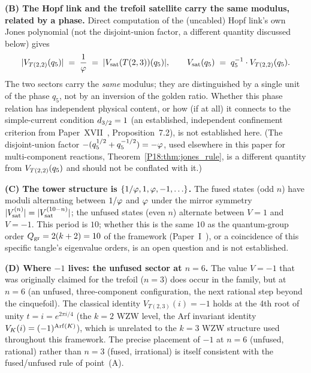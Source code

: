 \begin{remark}[The confinement criterion: fusion, not sector, and a phase relation between $\QH=2$ and $\QH=3$]
\textbf{(B) The Hopf link and the trefoil satellite carry the same
modulus, related by a phase.}  Direct computation of the (uncabled)
Hopf link's own Jones polynomial (not the disjoint-union factor, a
different quantity discussed below) gives
\begin{equation}
  |V_{T(2,2)}(q_5)| \;=\; \frac{1}{\varphi}
  \;=\; |V_{\rm sat}(T(2,3))(q_5)|,
  \qquad
  V_{\rm sat}(q_5) \;=\; q_5^{-1}\cdot V_{T(2,2)}(q_5).
  \label{P18:eq:phase_relation}
\end{equation}
The two sectors carry the \emph{same} modulus; they are distinguished
by a single unit of the phase $q_5$, not by an inversion of the
golden ratio.  Whether this phase relation has independent physical
content, or how (if at all) it connects to the simple-current
condition $d_{3/2}=1$ (an established, independent confinement
criterion from Paper~XVII~\cite{Paper17}, Proposition~7.2), is not
established here.
(The disjoint-union factor $-(q_5^{1/2}+q_5^{-1/2})=-\varphi$, used
elsewhere in this paper for multi-component reactions,
Theorem~\ref{P18:thm:jones_rule}, is a different quantity from
$V_{T(2,2)}(q_5)$ and should not be conflated with it.)

\textbf{(C) The tower structure is $\{1/\varphi, 1, \varphi, -1, \ldots\}$.}
The fused states (odd $n$) have moduli alternating between $1/\varphi$
and $\varphi$ under the mirror symmetry
$|V_{\rm sat}^{(n)}|=|V_{\rm sat}^{(10-n)}|$;
the unfused states (even $n$) alternate between $V=1$ and $V=-1$.
This period is $10$; whether this is the same $10$ as the
quantum-group order $Q_{\rm gr}=2(k+2)=10$ of the framework
(Paper~I~\cite{Paper1}), or a coincidence of this specific tangle's
eigenvalue orders, is an open question and is not established.

\textbf{(D) Where $-1$ lives: the unfused sector at $n=6$.}
The value $V=-1$ that was originally claimed for the trefoil ($n=3$)
does occur in the family, but at $n=6$ (an unfused, three-component
configuration, the next rational step beyond the cinquefoil).
The classical identity $V_{T(2,3)}(i)=-1$ holds at the 4th root of
unity $t=i=e^{2\pi i/4}$ (the $k=2$ WZW level, the Arf invariant
identity $V_K(i)=(-1)^{{\rm Arf}(K)}$), which is unrelated to
the $k=3$ WZW structure used throughout this framework.
The precise placement of $-1$ at $n=6$ (unfused, rational) rather
than $n=3$ (fused, irrational) is itself consistent with the
fused/unfused rule of point~(A).
\end{remark}

